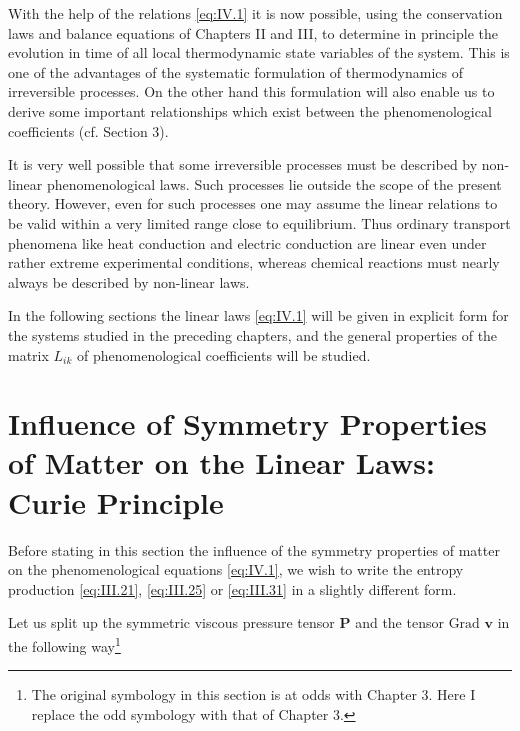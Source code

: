 With the help of the relations \eqref{eq:IV.1} it is now possible, using the conservation laws and balance equations of Chapters II and III, to determine in principle the evolution in time  of all local thermodynamic state variables of the system. This is one of the advantages of the systematic formulation of thermodynamics of irreversible processes. On the other hand this formulation will also enable us to derive some important relationships which exist between the phenomenological coefficients (cf. Section 3).

It is very well possible that some irreversible processes must be described by non-linear phenomenological laws. Such processes lie outside the scope of the present theory. However, even for such processes one may assume the linear relations to be valid within a very limited range close to equilibrium. Thus ordinary transport phenomena like heat conduction and electric conduction are linear even under rather extreme experimental conditions, whereas chemical reactions must nearly always be described by non-linear laws.

In the following sections the linear laws \eqref{eq:IV.1} will be given in explicit form for the systems studied in the preceding chapters, and the general properties of the matrix $L_{ik}$ of phenomenological coefficients will be studied.

\section{Influence of Symmetry Properties of Matter on the Linear Laws: Curie Principle}

Before stating in this section the influence of the symmetry properties of matter on the phenomenological equations \eqref{eq:IV.1}, we wish to write the entropy production \eqref{eq:III.21}, \eqref{eq:III.25} or \eqref{eq:III.31} in a slightly
different form.

Let us split up the symmetric viscous pressure tensor $\bm{P}$ and the tensor $\textrm{Grad } \bm{v}$ in the following way\footnote{The original symbology in this section is at odds with Chapter 3. Here I replace the odd symbology with that of Chapter 3.}

